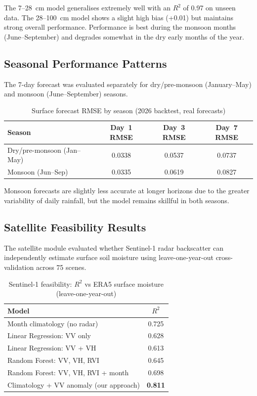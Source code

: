 \documentclass[12pt, a4paper]{article}
\begin{document}
The 7--28~cm model generalises extremely well with an $R^2$ of 0.97 on unseen data. The 28--100~cm model shows a slight high bias (+0.01) but maintains strong overall performance. Performance is best during the monsoon months (June--September) and degrades somewhat in the dry early months of the year.

\subsection{Seasonal Performance Patterns}

The 7-day forecast was evaluated separately for dry/pre-monsoon (January--May) and monsoon (June--September) seasons.

\begin{table}[H]
\centering
\caption{Surface forecast RMSE by season (2026 backtest, real forecasts)}
\label{tab:seasonal}
\begin{tabular}{lccc}
\toprule
\textbf{Season} & \textbf{Day~1 RMSE} & \textbf{Day~3 RMSE} & \textbf{Day~7 RMSE} \\
\midrule
Dry/pre-monsoon (Jan--May) & 0.0338 & 0.0537 & 0.0737 \\
Monsoon (Jun--Sep)         & 0.0335 & 0.0619 & 0.0827 \\
\bottomrule
\end{tabular}
\end{table}

Monsoon forecasts are slightly less accurate at longer horizons due to the greater variability of daily rainfall, but the model remains skillful in both seasons.

\subsection{Satellite Feasibility Results}

The satellite module evaluated whether Sentinel-1 radar backscatter can independently estimate surface soil moisture using leave-one-year-out cross-validation across 75 scenes.

\begin{table}[H]
\centering
\caption{Sentinel-1 feasibility: $R^2$ vs ERA5 surface moisture (leave-one-year-out)}
\label{tab:satellite}
\begin{tabular}{lc}
\toprule
\textbf{Model} & \textbf{$R^2$} \\
\midrule
Month climatology (no radar) & 0.725 \\
Linear Regression: VV only & 0.628 \\
Linear Regression: VV + VH & 0.613 \\
Random Forest: VV, VH, RVI & 0.645 \\
Random Forest: VV, VH, RVI + month & 0.698 \\
Climatology + VV anomaly (our approach) & \textbf{0.811} \\
\bottomrule
\end{tabular}
\end{table}
\end{document}
